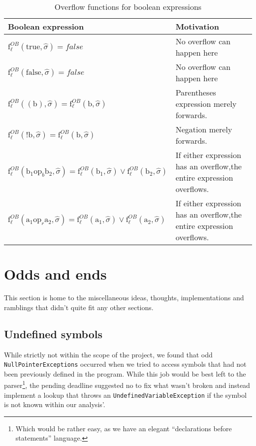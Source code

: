 \begin{table}[h]
\begin{tabular}{| l | l |}
  \hline
  Boolean expression & Motivation\\
  \hline
  \hline
  $\text{f}_\ell^{OB} (\text{true},\widehat{\sigma}) = false $ & No overflow can happen here\\ 
  \hline
  $\text{f}_\ell^{OB} (\text{false},\widehat{\sigma}) = false $ & No overflow can happen here\\ 
  \hline
  $\text{f}_\ell^{OB} ((\text{b}),\widehat{\sigma}) = \text{f}_\ell^{OB} (\text{b}, \widehat{\sigma}) $ & Parentheses expression merely forwards.\\ 
  \hline
    $\text{f}_\ell^{OB} (\text{!b},\widehat{\sigma}) = \text{f}_\ell^{OB} (\text{b}, \widehat{\sigma}) $ & Negation merely forwards.\\ 
  \hline
   $\text{f}_\ell^{OB} (\text{b}_1 \text{op}_b \text{b}_2, \widehat{\sigma}) = \text{f}_\ell^{OB} (\text{b}_1, \widehat{\sigma}) \vee \text{f}_\ell^{OB} (\text{b}_2, \widehat{\sigma})$ & If either expression has an overflow,the entire expression overflows.\\     
  \hline
     $\text{f}_\ell^{OB} (\text{a}_1 \text{op}_r \text{a}_2, \widehat{\sigma}) = \text{f}_\ell^{OB} (\text{a}_1, \widehat{\sigma}) \vee \text{f}_\ell^{OB} (\text{a}_2, \widehat{\sigma})$ & If either expression has an overflow,the entire expression overflows.\\     
  \hline
\end{tabular}
\centering
\caption{Overflow functions for boolean expressions}
\label{table:overflow_functions_boolean_expressions}
\end{table}





\section{Odds and ends}
This section is home to the miscellaneous ideas, thoughts, implementations and ramblings that didn't quite fit any other sections.

\subsection{Undefined symbols}
While strictly not within the scope of the project, we found that odd \texttt{NullPointerExceptions} occurred when we tried to access symbols that had not been previously defined in the program. While this job would be best left to the parser\footnote{Which would be rather easy, as we have an elegant ``declarations before statements'' language.}, the pending deadline suggested no to fix what wasn't broken and instead implement a lookup that throws an \texttt{UndefinedVariableException} if the symbol is not known within our analysis'.

